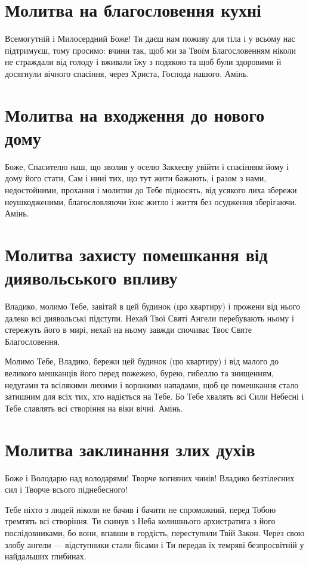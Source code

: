 \documentclass[chapters.tex]{subfiles}
\begin{document}
\section{Молитва на благословення кухні}
Всемогутній і Милосердний Боже! Ти даєш нам поживу для тіла і у всьому нас підтримуєш, тому просимо: вчини так, щоб ми за Твоїм Благословенням ніколи не страждали від голоду і вживали їжу з подякою та щоб були здоровими й досягнули вічного спасіння, через Христа, Господа нашого. Амінь.

\section{Молитва на входження до нового дому}
Боже, Спасителю наш, що зволив у оселю Закхеєву увійти і спасінням йому і дому його стати, Сам і нині тих, що тут жити бажають, і разом з нами, недостойними, прохання і молитви до Тебе підносять, від усякого лиха збережи неушкодженими, благословляючи їхнє житло і життя без осудження зберігаючи. Амінь.

\section{Молитва захисту помешкання від диявольського впливу}
Владико, молимо Тебе, завітай в цей будинок (цю квартиру) і прожени від нього далеко всі диявольські підступи. Нехай Твої Святі Ангели перебувають ньому і стережуть його в мирі, нехай на ньому завжди спочиває Твоє Святе Благословення.

Молимо Тебе, Владико, бережи цей будинок (цю квартиру) і від малого до великого мешканців його перед пожежею, бурею, гибеллю та знищенням, недугами та всілякими лихими і ворожими нападами, щоб це помешкання стало затишним для всіх тих, хто надіється на Тебе. Бо Тебе хвалять всі Сили Небесні і Тебе славлять всі створіння на віки вічні. Амінь.

\section{Молитва заклинання злих духів}
Боже і Володарю над володарями! Творче вогняних чинів! Владико безтілесних сил і Творче всього піднебесного!

Тебе ніхто з людей ніколи не бачив і бачити не спроможний, перед Тобою тремтять всі створіння. Ти скинув з Неба колишнього архистратига з його послідовниками, бо вони, впавши в гордість, переступили Твій Закон. Через свою злобу ангели — відступники стали бісами і Ти передав їх темряві безпросвітній у найдальших глибинах.
\end{document}
